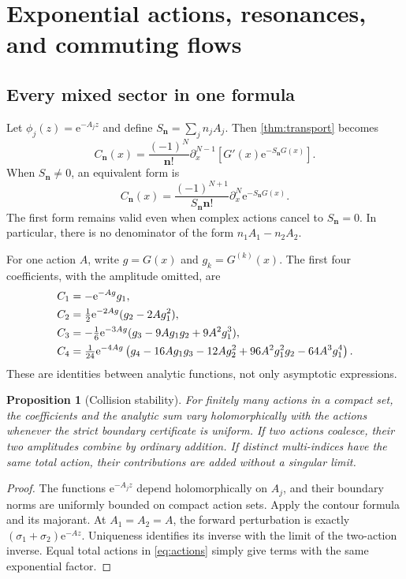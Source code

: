 \documentclass[11pt,a4paper]{article}
\numberwithin{equation}{section}
\newtheorem{proposition}[theorem]{Proposition}
\theoremstyle{definition}
\theoremstyle{remark}
\newcommand{\e}{\mathrm e}
\newcommand{\bn}{\boldsymbol n}
\begin{document}
\section{Exponential actions, resonances, and commuting flows}
\label{sec:actions}

\subsection{Every mixed sector in one formula}
Let $\phi_j(z)=\e^{-A_jz}$ and define $S_{\bn}=\sum_jn_jA_j$. Then \cref{thm:transport} becomes
\begin{equation}
 C_{\bn}(x)=\frac{(-1)^N}{\bn!}
 \partial_x^{N-1}\left[G'(x)\e^{-S_{\bn}G(x)}\right].
 \label{eq:actions}
\end{equation}
When $S_{\bn}\neq0$, an equivalent form is
\begin{equation}
 C_{\bn}(x)=\frac{(-1)^{N+1}}{S_{\bn}\bn!}
 \partial_x^N\e^{-S_{\bn}G(x)}.
 \label{eq:bell-form}
\end{equation}
The first form remains valid even when complex actions cancel to $S_{\bn}=0$. In particular, there is no denominator of the form $n_1A_1-n_2A_2$.

For one action $A$, write $g=G(x)$ and $g_k=G^{(k)}(x)$. The first four coefficients, with the amplitude omitted, are
\begin{align}
 C_1&=-\e^{-Ag}g_1,\notag\\
 C_2&=\tfrac12\e^{-2Ag}(g_2-2Ag_1^2),\notag\\
 C_3&=-\tfrac16\e^{-3Ag}(g_3-9Ag_1g_2+9A^2g_1^3),\label{eq:first-sectors}\\
 C_4&=\tfrac1{24}\e^{-4Ag}
 \left(g_4-16Ag_1g_3-12Ag_2^2
       +96A^2g_1^2g_2-64A^3g_1^4\right).\notag
\end{align}
These are identities between analytic functions, not only asymptotic expressions.

\begin{proposition}[Collision stability]
\label{prop:collision}
For finitely many actions in a compact set, the coefficients and the analytic sum vary holomorphically with the actions whenever the strict boundary certificate is uniform. If two actions coalesce, their two amplitudes combine by ordinary addition. If distinct multi-indices have the same total action, their contributions are added without a singular limit.
\end{proposition}
\begin{proof}
The functions $\e^{-A_jz}$ depend holomorphically on $A_j$, and their boundary norms are uniformly bounded on compact action sets. Apply the contour formula and its majorant. At $A_1=A_2=A$, the forward perturbation is exactly $(\sigma_1+\sigma_2)\e^{-Az}$. Uniqueness identifies its inverse with the limit of the two-action inverse. Equal total actions in \eqref{eq:actions} simply give terms with the same exponential factor.
\end{proof}
\end{document}
